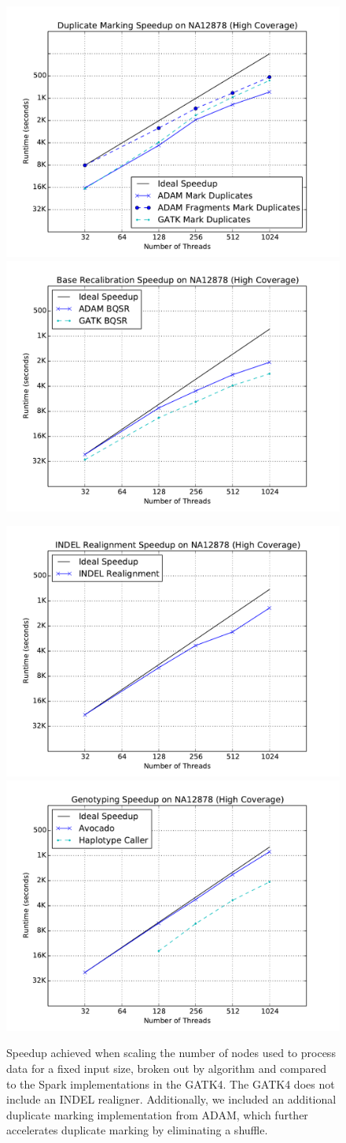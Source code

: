 \documentclass[phd]{ucbthesis}
\begin{document}
\begin{figure}[h]
  \begin{center}
    \includegraphics[width=0.45\linewidth]{graphs/speedup-md.pdf}
    \includegraphics[width=0.45\linewidth]{graphs/speedup-bqsr.pdf}
  \end{center}
  \begin{center}
    \includegraphics[width=0.45\linewidth]{graphs/speedup-ir.pdf}
    \includegraphics[width=0.45\linewidth]{graphs/speedup-gt.pdf}
  \end{center}
  \caption{Speedup achieved when scaling the number of nodes used to process
    data for a fixed input size, broken out by algorithm and compared to the
    Spark implementations in the GATK4. The GATK4 does not include an INDEL
    realigner. Additionally, we included an additional duplicate marking
    implementation from ADAM, which further accelerates duplicate marking by
    eliminating a shuffle.}
  \label{fig:vs-gatk}
\end{figure}
\end{document}
